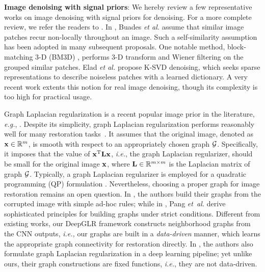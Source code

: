 \documentclass[10pt,twocolumn,letterpaper]{article}
\begin{document}
\textbf{Image denoising with signal priors}:
We hereby review a few representative works on image denoising with signal priors for denoising. For a more complete review, we refer the readers to \cite{milanfar2013tour}. In \cite{buades2005non}, Buades {\it et al.} assume that similar image patches recur non-locally throughout an image. Such a self-similarity assumption has been adopted in many subsequent proposals. One notable method, block-matching 3-D (BM3D) \cite{dabov2007image}, performs 3-D transform and Wiener filtering on the grouped similar patches. Elad {\it et al.} \cite{elad2006image} propose K-SVD
denoising, which seeks sparse representations to describe noiseless patches with a learned dictionary. 
A very recent work \cite{xu2018trilateral} extents this notion for real image denoising, though its complexity is too high for practical usage.

Graph Laplacian regularization is a recent popular image prior in the literature, {\it e.g.}, \cite{pang2017graph,elmoataz2008nonlocal,gilboa2007nonlocal}. 
Despite its simplicity, graph Laplacian regularization performs reasonably well for many restoration tasks~\cite{milanfar2013tour}. 
It assumes that the original image, denoted as ${\bf x}\in\mathbb{R}^m$, is smooth with respect to an appropriately chosen graph ${\cal G}$. 
Specifically, it imposes that the value of ${\bf x}^{\rm T}{\bf L}{\bf x}$, {\it i.e.}, the graph Laplacian regularizer, should be small for the original image ${\bf x}$, where ${\bf L}\in \mathbb{R}^{m\times m}$ is the Laplacian matrix of graph ${\cal G}$. 
Typically, a graph Laplacian regularizer is employed for a quadratic programming (QP) formulation \cite{pang2017graph,hu2016graph,liu2014progressive}. 
Nevertheless, choosing a proper graph for image restoration remains an open question. 
In \cite{elmoataz2008nonlocal,liu2014progressive}, the authors build their graphs from the corrupted image with simple ad-hoc rules; while in \cite{pang2017graph}, Pang {\it et~al.} derive sophisticated principles for building graphs under strict conditions. 
Different from existing works, our DeepGLR framework constructs neighborhood graphs from the CNN outputs, {\it i.e.,} our graphs are built in a {\it data-driven} manner, which learns the appropriate graph connectivity for restoration directly. In \cite{shen2016deep,barron2016fast}, the authors also formulate graph Laplacian regularization in a deep learning pipeline; yet unlike ours, their graph constructions are fixed functions, {\it i.e.}, they are not data-driven.
\end{document}
